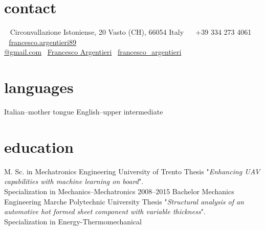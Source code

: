 \documentclass[]{friggeri-cv} %
\newcommand{\LinkedinColour}{{\color{linkedin} \faLinkedin}}
\newcommand{\Email}{{\color{black} \faEnvelope \,}}
\newcommand{\Skype}{{\color{skypeblue} \faSkype}}
\newcommand{\Phone}{{\color{phonegreen} \faPhone}}
\begin{document}


\begin{aside} %
  \section{contact}
  ~
  Circonvallazione Istoniense, 20
  Vasto (CH), 66054
  Italy
  ~
  \Phone \, +39 334 273 4061
  ~
  \Email \, \href{mailto:francesco.argentieri89@gmail.com}{francesco.argentieri89\\@gmail.com}
  \LinkedinColour \, \href{https://it.linkedin.com/in/francesco-argentieri}{Francesco Argentieri}
  \Skype \, \href{skype:my_username?add}{francesco\_argentieri}
  \section{languages}
  Italian--mother tongue
  English--upper intermediate
\end{aside}


\section{education}
  \begin{entrylist}
    {M. Sc. {\normalfont in Mechatronics Engineering}}
    {University of Trento}
    {Thesis "\emph{Enhancing UAV capabilities with machine learning on board}".\\
    Specialization in Mechanics--Mechatronics}
    \entry
    {2008--2015}
    {Bachelor {\normalfont Mechanics Engineering}}
    {Marche Polytechnic University}
    {Thesis "\emph{Structural analysis of an automotive hot formed sheet component with variable thickness}".\\
    Specialization in Energy-Thermomechanical}
  \end{entrylist}
\end{document}
